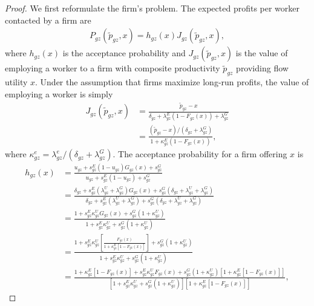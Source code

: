 \begin{proof}
    We first reformulate the firm's problem. The expected profits per worker contacted by a firm are
    \begin{align}
        P_{gz}(\tilde{p}_{gz}, x) = h_{gz}(x) J_{gz}(\tilde{p}_{gz}, x),
    \end{align}
    where $h_{gz}(x)$ is the acceptance probability and $J_{gz}(\tilde{p}_{gz}, x)$ is the value of employing a worker to a firm with composite productivity $\tilde{p}_{gz}$ providing flow utility $x$. Under the assumption that firms maximize long-run profits, the value of employing a worker is simply
    \begin{align}
        J_{gz}(\tilde{p}_{gz}, x) %
        &= \frac{\tilde{p}_{gz} - x}{\delta_{gz} + \lambda_{gz}^{E}(1 - F_{gz}(x)) + \lambda_{gz}^{G}}\\
        &= \frac{\left(\tilde{p}_{gz}-x\right)/\left(\delta_{gz}+\lambda_{gz}^{G}\right)}{1+\kappa_{gz}^{E}\left(1-F_{gz}\left(x\right)\right)},
    \end{align}
    where $\kappa_{gz}^e = \lambda_{gz}^e/(\delta_{gz} + \lambda_{gz}^{G})$. The acceptance probability for a firm offering $x$ is
    \begin{align}
        h_{gz}(x) %
        &= \frac{u_{gz}+s_{gz}^{E}\left(1-u_{gz}\right)G_{gz}\left(x\right)+s_{gz}^{G}}{u_{gz}+s_{gz}^{E}\left(1-u_{gz}\right)+s_{gz}^{G}} \\
        &=\frac{\delta_{gz}+s_{gz}^{E}\left(\lambda_{gz}^{U}+\lambda_{gz}^{G}\right)G_{gz}\left(x\right)+s_{gz}^{G}\left(\delta_{gz}+\lambda_{gz}^{U}+\lambda_{gz}^{G}\right)}{\delta_{gz}+s_{gz}^{E}\left(\lambda_{gz}^{U}+\lambda_{gz}^{G}\right)+s_{gz}^{G}\left(\delta_{gz}+\lambda_{gz}^{U}+\lambda_{gz}^{G}\right)}\\
        &=\frac{1+s_{gz}^{E}\kappa_{gz}^{U}G_{gz}\left(x\right)+s_{gz}^{G}\left(1+\kappa_{gz}^{U}\right)}{1+s_{gz}^{E}\kappa_{gz}^{U}+s_{gz}^{G}\left(1+\kappa_{gz}^{U}\right)}\\
        &=\frac{1+s_{gz}^{E}\kappa_{gz}^{U}\left[\frac{F_{gz}\left(x\right)}{1+\kappa_{gz}^{E}\left[1-F_{gz}\left(x\right)\right]}\right]+s_{gz}^{G}\left(1+\kappa_{gz}^{U}\right)}{1+s_{gz}^{E}\kappa_{gz}^{U}+s_{gz}^{G}\left(1+\kappa_{gz}^{U}\right)}\\
        &=\frac{1+\kappa_{gz}^{E}\left[1-F_{gz}\left(x\right)\right]+s_{gz}^{E}\kappa_{gz}^{U}F_{gz}\left(x\right)+s_{gz}^{G}\left(1+\kappa_{gz}^{U}\right)\left[1+\kappa_{gz}^{E}\left[1-F_{gz}\left(x\right)\right]\right]}{\left[1+s_{gz}^{E}\kappa_{gz}^{U}+s_{gz}^{G}\left(1+\kappa_{gz}^{U}\right)\right]\left[1+\kappa_{gz}^{E}\left[1-F_{gz}\left(x\right)\right]\right]},

\end{align}
\end{proof}
